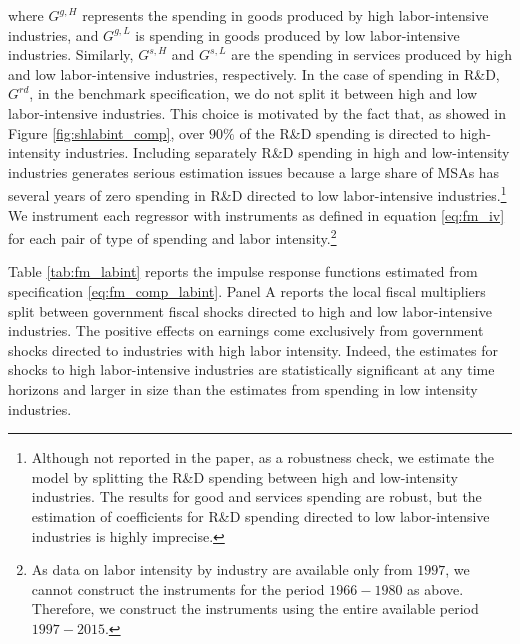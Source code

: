 \documentclass[dv_diss_main.tex]{subfiles}
\begin{document}
where $G^{g,H}$ represents the spending in goods produced by high labor-intensive industries, and $G^{g,L}$ is spending in goods produced by low labor-intensive industries. Similarly,  $G^{s,H}$ and $G^{s,L}$ are the spending in services produced by high and low labor-intensive industries, respectively. In the case of spending in R\&D, $G^{rd}$, in the benchmark specification, we do not split it between high and low labor-intensive industries. This choice is motivated by the fact that, as showed in Figure \ref{fig:shlabint_comp}, over $90\%$ of the R\&D spending is directed to high-intensity industries. Including separately R\&D spending in high and low-intensity industries generates serious estimation issues because a large share of MSAs has several years of zero spending in R\&D directed to low labor-intensive industries.\footnote{Although not reported in the paper, as a robustness check, we estimate the model by splitting the R\&D spending between high and low-intensity industries. The results for good and services spending are robust, but the estimation of coefficients for R\&D spending directed to low labor-intensive industries is highly imprecise.} We instrument each regressor with instruments as defined in equation \eqref{eq:fm_iv} for each pair of type of spending and labor intensity.\footnote{As data on labor intensity by industry are available only from $1997$, we cannot construct the instruments for the period $1966-1980$ as above. Therefore, we construct the instruments using the entire available period $1997-2015$.}

Table \ref{tab:fm_labint} reports the impulse response functions estimated from specification \eqref{eq:fm_comp_labint}. Panel A reports the local fiscal multipliers split between government fiscal shocks directed to high and low labor-intensive industries. The positive effects on earnings come exclusively from government shocks directed to industries with high labor intensity. Indeed, the estimates for shocks to high labor-intensive industries are statistically significant at any time horizons and larger in size than the estimates from spending in low intensity industries.
\end{document}
